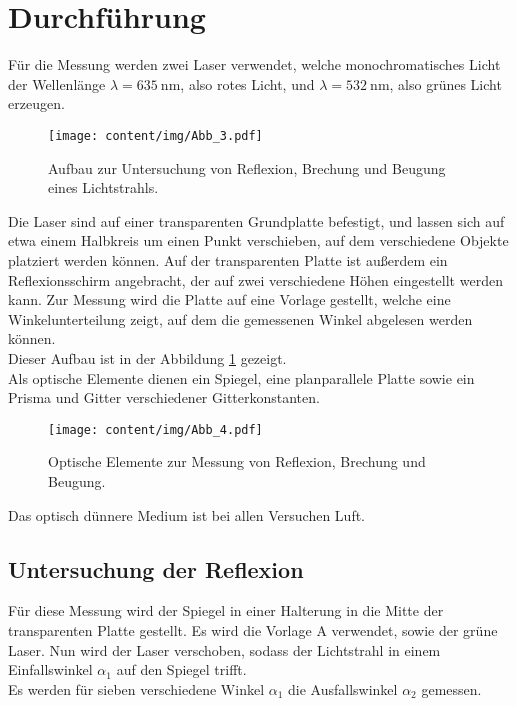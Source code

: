 \section{Durchführung}

    Für die Messung werden zwei Laser verwendet,
    welche monochromatisches Licht der Wellenlänge $\lambda = \SI{635}{\nano\meter}$,
    also rotes Licht,
    und $\lambda = \SI{532}{\nano\meter}$,
    also grünes Licht erzeugen.
    \begin{figure}[H]
        \centering
        \texttt{[image: content/img/Abb\_3.pdf]}
        \caption{Aufbau zur Untersuchung von Reflexion, Brechung und Beugung eines Lichtstrahls.}
        \label{fig:aufbau_platte}
    \end{figure}
    Die Laser sind auf einer transparenten Grundplatte befestigt,
    und lassen sich auf etwa einem Halbkreis um einen Punkt verschieben,
    auf dem verschiedene Objekte platziert werden können.
    Auf der transparenten Platte ist außerdem ein Reflexionsschirm angebracht,
    der auf zwei verschiedene Höhen eingestellt werden kann.
    Zur Messung wird die Platte auf eine Vorlage gestellt,
    welche eine Winkelunterteilung zeigt,
    auf dem die gemessenen Winkel abgelesen werden können.\\
    Dieser Aufbau ist in der Abbildung \ref{fig:aufbau_platte} gezeigt.\\
    Als optische Elemente dienen ein Spiegel,
    eine planparallele Platte sowie ein Prisma und Gitter verschiedener Gitterkonstanten.
    \begin{figure}[H]
        \centering
        \texttt{[image: content/img/Abb\_4.pdf]}
        \caption{Optische Elemente zur Messung von Reflexion, Brechung und Beugung.}
        \label{fig:aufbau_elemente}
    \end{figure}
    Das optisch dünnere Medium ist bei allen Versuchen Luft.

\subsection{Untersuchung der Reflexion}

    Für diese Messung wird der Spiegel in einer Halterung in die Mitte der transparenten Platte gestellt.
    Es wird die Vorlage A verwendet,
    sowie der grüne Laser.
    Nun wird der Laser verschoben,
    sodass der Lichtstrahl in einem Einfallswinkel $\alpha_1$ auf den Spiegel trifft.\\
    Es werden für sieben verschiedene Winkel $\alpha_1$ die Ausfallswinkel $\alpha_2$ gemessen.

